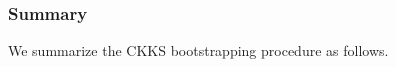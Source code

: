 \subsubsection{Summary}
\label{subsubsec:ckks-bootstrapping-summary}

We summarize the CKKS bootstrapping procedure as follows. 

